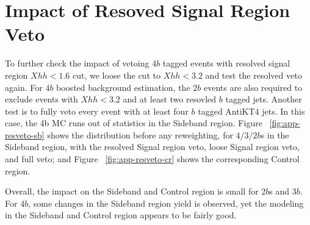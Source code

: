 \section{Impact of Resoved Signal Region Veto }
\label{app:resveto}

To further check the impact of vetoing 4$b$ tagged events with resolved signal region $Xhh < 1.6$ cut, we loose the cut to $Xhh < 3.2$ and test the resolved veto again. For $4b$ boosted background estimation, the $2b$ events are also required to exclude events with $Xhh < 3.2$ and at least two resovled $b$ tagged jets. Another test is to fully veto every event with at least four $b$ tagged AntiKT4 jets. In this case, the 4b \ttbar MC runs out of statistics in the Sideband region. Figure ~\ref{fig:app-resveto-sb} shows the distribution before any reweighting, for $4/3/2b$s in the Sideband region, with the resolved Signal region veto, loose Signal region veto, and full veto; and Figure ~\ref{fig:app-resveto-cr} shows the corresponding Control region.

Overall, the impact on the Sideband and Control region is small for 2$b$s and 3$b$. For 4$b$, some changes in the Sideband region yield is observed, yet the modeling in the Sideband and Control region appears to be fairly good. 

